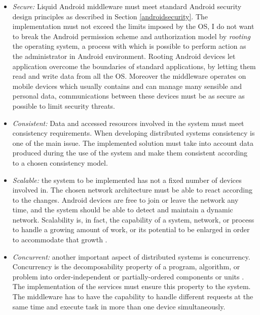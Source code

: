 \begin{itemize}
	\item \textit{Secure:} Liquid Android middleware must meet standard Android security design principles as described in Section \ref{androidsecurity}. The implementation must not exceed the limits imposed by the OS, I do not want to break the Android permission scheme and authorization model by \textit{rooting} the operating system, a process with which is possible to perform action as the administrator in Android environment. Rooting Android devices let application overcome the boundaries of standard applications, by letting them read and write data from all the OS. Moreover the middleware operates on mobile devices which usually contains and can manage many sensible and personal data, communications between these devices must be as secure as possible to limit security threats.
	
	\item \textit{Consistent:} Data and accessed resources involved in the system must meet consistency requirements. When developing distributed systems consistency is one of the main issue. The implemented solution must take into account data produced during the use of the system and make them consistent according to a chosen consistency model.
	
	\item \textit{Scalable:} the system to be implemented has not a fixed number of devices involved in. The chosen network architecture must be able to react according to the changes. Android devices are free to join or leave the network any time, and the system should be able to detect and maintain a dynamic network. Scalability is, in fact, the capability of a system, network, or process to handle a growing amount of work, or its potential to be enlarged in order to accommodate that growth \cite{bondi2000characteristics}. 
	
	\item \textit{Concurrent:} another important aspect of distributed systems is concurrency. Concurrency is the decomposability property of a program, algorithm, or problem into order-independent or partially-ordered components or units \cite{lamport1978time}. The implementation of the services must ensure this property to the system. The middleware has to have the capability to handle different requests at the same time and execute task in more than one device simultaneously.
	
\end{itemize}

